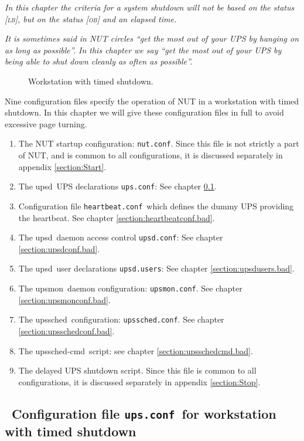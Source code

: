 \documentclass[12pt]{article}
\newlength{\headersep}\setlength{\headersep}{3mm}
\newcommand{\Hsep}{\hspace{\headersep}}
\newcommand{\newcolumn}{\vfill\eject}
\newcommand{\upsd}{\mbox{\textcolor{UPSDCOLOUR}{upsd}}}
\newcommand{\upsmon}{\mbox{\textcolor{MONCOLOUR}{upsmon}}}
\newcommand{\upssched}{\mbox{\textcolor{SCHEDCOLOUR}{upssched}}}
\newcommand{\upsschedcmd}{\mbox{\textcolor{CMDCOLOUR}{upssched-cmd}}}
\newcommand{\LB}{\textcolor{UPSDCOLOUR}{\textsc{lb}}}
\newcommand{\OB}{\textcolor{UPSDCOLOUR}{\textsc{ob}}}
\newcommand{\status}[1]{\textcolor{UPSDCOLOUR}{[{#1}]}}
\newcommand{\nutconf}{\textcolor{NUTCOLOUR}{\texttt{nut.conf}}}
\newcommand{\upsconf}{\textcolor{UPSDCOLOUR}{\texttt{ups.conf}}}
\newcommand{\heartbeatconf}{\textcolor{UPSDCOLOUR}{\texttt{heartbeat.conf}}}
\newcommand{\upsdconf}{\textcolor{UPSDCOLOUR}{\texttt{upsd.conf}}}
\newcommand{\upsdusers}{\textcolor{UPSDCOLOUR}{\texttt{upsd.users}}}
\newcommand{\upsmonconf}{\textcolor{MONCOLOUR}{\texttt{upsmon.conf}}}
\newcommand{\upsschedconf}{\textcolor{SCHEDCOLOUR}{\texttt{upssched.conf}}}
\newcommand{\ol}{\begin{enumerate}%
   \setlength{\itemsep}{0em}}
\newcommand{\eol}{\end{enumerate}}
\newcommand{\li}{\item}                 %
\newcommand{\Ref}[1]{\ref{#1}}
\begin{document}
\textsl{In this chapter the criteria for a system shutdown will not be based on
  the status \status{\LB}, but on the status \status{\OB} and an elapsed
  time.}

\textsl{It is sometimes said in NUT circles ``get the most out of your UPS by
  hanging on as long as possible''.  In this chapter we say ``get the most out
  of your UPS by being able to shut down cleanly as often as possible''.}

\begin{figure}[ht]
\begin{center}
\end{center}
\vspace{-6mm}
\caption{Workstation with timed shutdown.\label{fig:bad}}
\end{figure}

Nine configuration files specify the operation of NUT in a workstation with
timed shutdown.  In this chapter we will give these configuration files in
full to avoid excessive page turning.

\ol

\li The NUT startup configuration: \nutconf.  Since this file is not strictly
a part of NUT, and is common to all configurations, it is discussed separately
in appendix \Ref{section:Start}.

\li The \upsd\ UPS declarations \upsconf: See chapter \ref{section:upsconf.bad}.

\li Configuration file \heartbeatconf\ which defines the dummy UPS providing
the heartbeat.  See chapter \ref{section:heartbeatconf.bad}.

\li The \upsd\ daemon access control \upsdconf: See chapter
\ref{section:upsdconf.bad}.

\li The \upsd\ user declarations \upsdusers: See chapter
\ref{section:upsdusers.bad}.

\li The \upsmon\ daemon configuration: \upsmonconf.  See chapter
\ref{section:upsmonconf.bad}.

\li The \upssched\ configuration: \upsschedconf.  See chapter
\ref{section:upsschedconf.bad}.

\li The \upsschedcmd\ script: see chapter \ref{section:upsschedcmd.bad}.

\li The delayed UPS shutdown script.  Since this file is common to all
configurations, it is discussed separately in appendix \Ref{section:Stop}.

\eol

\subsection{\Hsep\ Configuration file \upsconf\ for workstation with timed shutdown}\label{section:upsconf.bad}
\end{document}
